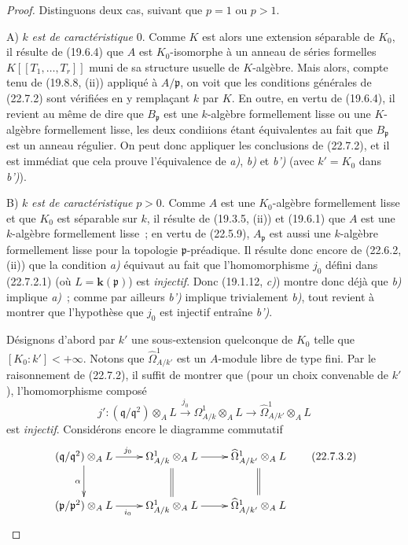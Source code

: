 \begin{proof}
Distinguons deux cas, suivant que $p=1$ ou $p>1$.

A) $k$ \emph{est de caractéristique} $0$. Comme $K$ est alors une
extension séparable de $K_0$, il résulte de (19.6.4) que $A$ est
$K_0$-isomorphe à un anneau de séries formelles $K[[T_1,\ldots,T_r]]$ muni de
sa structure usuelle de $K$-algèbre. Mais alors, compte tenu de (19.8.8, (ii))
appliqué à $A/\mathfrak p$, on voit que les conditions générales de (22.7.2)
sont vérifiées en y remplaçant $k$ par $K$. En outre, en vertu de (19.6.4), il
revient au même de dire que $B_{\mathfrak p}$ est une $k$-algèbre
formellement lisse ou une $K$-algèbre formellement lisse, les deux condi{\i}ions
étant équivalentes au fait que $B_{\mathfrak p}$ est un anneau régulier. On
peut donc appliquer les conclusions de (22.7.2), et il est immédiat que cela
prouve l'équivalence de \emph{a)}, \emph{b)} et \emph{b')} (avec $k'=K_0$ dans \emph{b')}).

B) $k$ \emph{est de caractéristique} $p>0$. Comme $A$ est une
$K_0$-algèbre formellement lisse et que $K_0$ est séparable sur $k$, il
résulte de (19.3.5, (ii)) et (19.6.1) que $A$ est une $k$-algèbre
formellement lisse~; en vertu de (22.5.9), $A_{\mathfrak p}$ est aussi une
$k$-algèbre formellement lisse pour la topologie $\mathfrak p$-préadique. Il
résulte donc encore de (22.6.2, (ii)) que la condition \emph{a)} équivaut au fait que
l'homomorphisme $j_0$ défini dans (22.7.2.1) (où $L=\boldsymbol{k}(\mathfrak p)$) est
\emph{injectif}. Donc (19.1.12, \emph{c)}) montre donc déjà que \emph{b)} implique \emph{a)}~; comme par
ailleurs \emph{b')} implique trivialement \emph{b)}, tout revient à montrer que l'hypothèse
que $j_0$ est injectif entraîne \emph{b')}.

Désignons d'abord par $k'$ une sous-extension quelconque de $K_0$ telle que
$[K_0:k']<+\infty$. Notons que $\widehat\Omega^1_{A/k'}$ est un $A$-module
libre de type fini. Par le raisonnement de (22.7.2), il suffit de montrer que
(pour un choix convenable de $k'$), l'homomorphisme composé
\begin{equation}
\label{0.22.7.3.1-fr}
  j':(\mathfrak q/\mathfrak q^2)\otimes_AL
  \xrightarrow{j_0}\Omega^1_{A/k}\otimes_AL
  \longrightarrow\widehat\Omega^1_{A/k'}\otimes_AL
  \tag{22.7.3.1}
\end{equation}
est \emph{injectif}. Considérons encore le diagramme commutatif
\begin{equation}
\label{0.22.7.3.2-fr}
\xymatrix{
  (\mathfrak q/\mathfrak q^2)\otimes_AL
    \ar[r]^{j_0} \ar[d]_\alpha &
  \Omega^1_{A/k}\otimes_AL \ar[r] \ar@{=}[d] &
  \widehat\Omega^1_{A/k'}\otimes_AL \ar@{=}[d] \\
  (\mathfrak p/\mathfrak p^2)\otimes_AL
    \ar[r]_{i_0} &
  \Omega^1_{A/k}\otimes_AL \ar[r] &
  \widehat\Omega^1_{A/k'}\otimes_AL
}
\tag{22.7.3.2}
\end{equation}


\end{proof}
